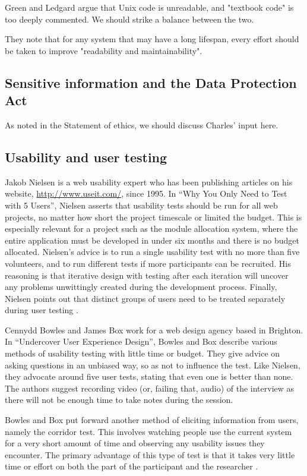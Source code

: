 \documentclass[]{scrartcl}
\begin{document}
Green and Ledgard argue that Unix code is unreadable, and "textbook code" is too deeply commented. We should strike a balance between the two.

They note that for any system that may have a long lifespan, every effort should be taken to improve "readability and maintainability".

\subsection{Sensitive information and the Data Protection Act}
\label{sec:dataprotection}

As noted in the Statement of ethics, we should discuss Charles' input here.

\subsection{Usability and user testing}

Jakob Nielsen is a web usability expert who has been publishing articles on
his website, \url{http://www.useit.com/}, since 1995. In ``Why You Only Need to
Test with 5 Users'', Nielsen asserts that usability tests should be run for all
web projects, no matter how short the project timescale or limited the budget.
This is especially relevant for a project such as the module allocation
system, where the entire application must be developed in under six months and
there is no budget allocated. Nielsen's advice is to run a single usability
test with no more than five volunteers, and to run different tests if more
participants can be recruited. His reasoning is that iterative design with
testing after each iteration will uncover any problems unwittingly created
during the development process. Finally, Nielsen points out that distinct
groups of users need to be treated separately during user testing
\cite{nielsen2000fiveusers}.

Cennydd Bowles and James Box work for a web design agency based in Brighton.
In ``Undercover User Experience Design'', Bowles and Box describe various
methods of usability testing with little time or budget. They give advice on
asking questions in an unbiased way, so as not to influence the test. Like
Nielsen, they advocate around five user tests, stating that even one is better
than none. The authors suggest recording video (or, failing that, audio) of
the interview as there will not be enough time to take notes during the
session.

Bowles and Box put forward another method of eliciting information from users,
namely the corridor test. This involves watching people use the current system
for a very short amount of time and observing any usability issues they
encounter. The primary advantage of this type of test is that it takes very
little time or effort on both the part of the participant and the researcher
\cite{bowles2011undercover}.
\end{document}
